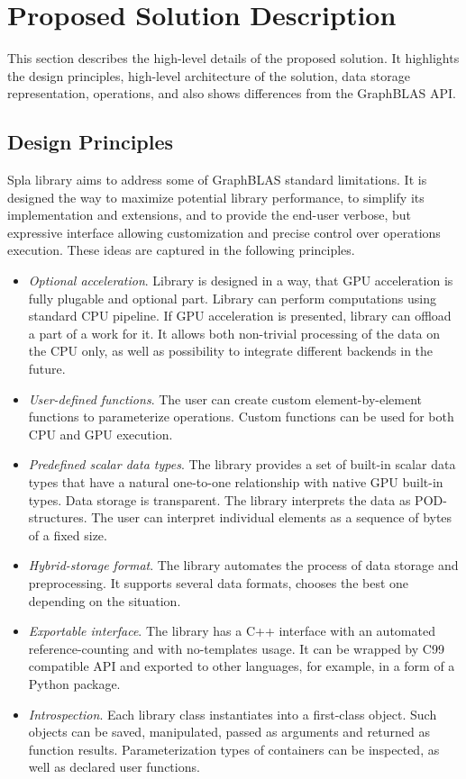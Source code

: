 \section{Proposed Solution Description}

This section describes the high-level details of the proposed solution. 
It highlights the design principles, high-level architecture of the solution, data storage representation, operations, and also shows differences from the GraphBLAS API.

\subsection{Design Principles}

Spla library aims to address some of GraphBLAS standard limitations.
It is designed the way to maximize potential library performance, to simplify its implementation and extensions, and to provide the end-user verbose, but expressive interface allowing customization and precise control over operations execution. 
These ideas are captured in the following principles.

\begin{itemize}
    \item \textit{Optional acceleration}. Library is designed in a way, that GPU acceleration is fully plugable and optional part. Library can perform computations using standard CPU pipeline. If GPU acceleration is presented, library can offload a part of a work for it. It allows both non-trivial processing of the data on the CPU only, as well as possibility to integrate different backends in the future.  
    \item \textit{User-defined functions}. The user can create custom element-by-element functions to parameterize operations. Custom functions can be used for both CPU and GPU execution.
    \item \textit{Predefined scalar data types}. The library provides a set of built-in scalar data types that have a natural one-to-one relationship with native GPU built-in types. Data storage is transparent. The library interprets the data as POD-structures. The user can interpret individual elements as a sequence of bytes of a fixed size.
    \item \textit{Hybrid-storage format}. The library automates the process of data storage and preprocessing. It supports several data formats, chooses the best one depending on the situation.
    \item \textit{Exportable interface}. The library has a C++ interface with an automated reference-counting and with no-templates usage. It can be wrapped by C99 compatible API and exported to other languages, for example, in a form of a Python package.
    \item \textit{Introspection}. Each library class instantiates into a first-class object. Such objects can be saved, manipulated, passed as arguments and returned as function results. Parameterization types of containers can be inspected, as well as declared user functions.
\end{itemize}

